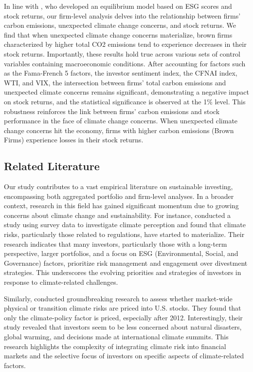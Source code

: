 \documentclass[12pt]{article}
\begin{document}
In line with \cite{pastor2021sustainable}, who developed an equilibrium model based on ESG scores and stock returns, our firm-level analysis delves into the relationship between firms' carbon emissions, unexpected climate change concerns, and stock returns. We find that when unexpected climate change concerns materialize, brown firms characterized by higher total CO2 emissions tend to experience decreases in their stock returns. Importantly, these results hold true across various sets of control variables containing macroeconomic conditions. After accounting for factors such as the Fama-French 5 factors, the investor sentiment index, the CFNAI index, WTI, and VIX, the intersection between firms' total carbon emissions and unexpected climate concerns remains significant, demonstrating a negative impact on stock returns, and the statistical significance is observed at the 1\% level. This robustness reinforces the link between firms' carbon emissions and stock performance in the face of climate change concerns. When unexpected climate change concerns hit the economy, firms with higher carbon emissions (Brown Firms) experience losses in their stock returns. 

\subsection*{Related Literature}

Our study contributes to a vast empirical literature on sustainable investing, encompassing both aggregated portfolio and firm-level analyses. In a broader context, research in this field has gained significant momentum due to growing concerns about climate change and sustainability. For instance, \cite{krueger2020importance} conducted a study using survey data to investigate climate perception and found that climate risks, particularly those related to regulations, have started to materialize. Their research indicates that many investors, particularly those with a long-term perspective, larger portfolios, and a focus on ESG (Environmental, Social, and Governance) factors, prioritize risk management and engagement over divestment strategies. This underscores the evolving priorities and strategies of investors in response to climate-related challenges. 

Similarly, \cite{faccini2023dissecting} conducted groundbreaking research to assess whether market-wide physical or transition climate risks are priced into U.S. stocks. They found that only the climate-policy factor is priced, especially after 2012. Interestingly, their study revealed that investors seem to be less concerned about natural disasters, global warming, and decisions made at international climate summits. This research highlights the complexity of integrating climate risk into financial markets and the selective focus of investors on specific aspects of climate-related factors. 
		
\end{document}
